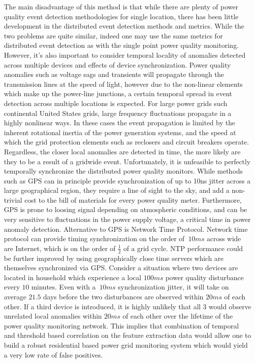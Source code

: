 The main disadvantage of this method is that while there are plenty of power quality event detection methodologies for single location, there has been little development in the distributed event detection methods and metrics. While the two problems are quite similar, indeed one may use the same metrics for distributed event detection as with the single point power quality monitoring. However, it's also important to consider temporal locality of anomalies detected across multiple devices and effects of device synchronization. Power quality anomalies such as voltage sags and transients will propagate through the transmission lines at the speed of light, however due to the non-linear elements which make up the power-line junctions, a certain temporal spread in event detection across multiple locations is expected. For large power grids such continental United States grids, large frequency fluctuations propagate in a highly nonlinear ways. In these cases the event propagation is limited by the inherent rotational inertia of the power generation systems, and the speed at which the grid protection elements such as reclosers and circuit breakers operate. Regardless, the closer local anomalies are detected in time, the more likely are they to be a result of a gridwide event. Unfortunately, it is unfeasible to perfectly temporally synchronize the distributed power quality monitors. While methods such as GPS can in principle provide synchronization of up to 10ns jitter across a large geographical region, they require a line of sight to the sky, and add a non-trivial cost to the bill of materials for every power quality meter. Furthermore, GPS is prone to loosing signal depending on atmospheric conditions, and can be very sensitive to fluctuations in the power supply voltage, a critical time in power anomaly detection. Alternative to GPS is Network Time Protocol. Network time protocol can provide timing synchronization on the order of $~10ms$ across wide are Internet, which is on the order of $\frac{1}{2}$ of a grid cycle. NTP performance could be further improved by using geographically close time servers which are themselves synchronized via GPS. Consider a situation where two devices are located in household which experience a local $100ms$ power quality disturbance every $10$ minutes. Even with a $~10ms$ synchronization jitter, it will take on average $21.5$ days before the two disturbances are observed within $20ms$ of each other. If a third device is introduced, it is highly unlikely that all 3 would observe unrelated local anomalies within $20ms$ of each other over the lifetime of the power quality monitoring network. This implies that combination of temporal and threshold based correlation on the feature extraction data would allow one to build a robust residential based power grid monitoring system which would yield a very low rate of false positives. 

